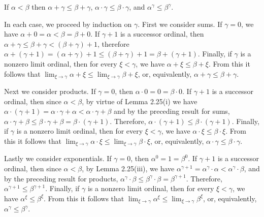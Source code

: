  If $\alpha < \beta$ then $\alpha + \gamma \leq \beta + \gamma$, 
$\alpha \cdot \gamma \leq \beta \cdot \gamma$, and 
$\alpha^{\gamma} \leq \beta^{\gamma}$.
\begin{solution}
In each case, we proceed by induction on $\gamma$. First we consider sums. If 
$\gamma = 0$, we have $\alpha + 0 = \alpha < \beta = \beta + 0$. If 
$\gamma + 1$ is a successor ordinal, then 
$\alpha + \gamma \leq \beta + \gamma < \left( \beta + \gamma \right) + 1$, 
therefore $\alpha + \left( \gamma + 1 \right) = \left( \alpha + \gamma \right)
+ 1 \leq \left( \beta + \gamma \right) + 1 = \beta + \left( \gamma + 1
\right)$. Finally, if $\gamma$ is a nonzero limit ordinal, then for every 
$\xi < \gamma$, we have $\alpha + \xi \leq \beta + \xi$. From this it follows 
that $\lim_{\xi \rightarrow \gamma} \alpha + \xi \leq \lim_{\xi \rightarrow 
\gamma} \beta + \xi$, or, equivalently, $\alpha + \gamma \leq \beta + \gamma$.

Next we consider products. If $\gamma = 0$, then 
$\alpha \cdot 0 = 0 = \beta \cdot 0$. If $\gamma + 1$ is a successor ordinal, 
then since $\alpha < \beta$, by virtue of Lemma 2.25(i) we have 
$\alpha \cdot \left( \gamma + 1 \right) = \alpha \cdot \gamma + \alpha < \alpha
\cdot \gamma + \beta$ and by the preceding result for sums, 
$\alpha \cdot \gamma + \beta \leq \beta \cdot \gamma + \beta = \beta \cdot 
\left( \gamma + 1 \right)$. Therefore, 
$\alpha \cdot \left( \gamma + 1 \right) \leq \beta \cdot \left( \gamma + 1 
\right)$. Finally, if $\gamma$ is a nonzero limit ordinal, then for every 
$\xi < \gamma$, we have $\alpha \cdot \xi \leq \beta \cdot \xi$. From this it 
follows that 
$\lim_{\xi \rightarrow \gamma} \alpha \cdot \xi \leq \lim_{\xi \rightarrow 
\gamma} \beta \cdot \xi$, or, equivalently, 
$\alpha \cdot \gamma \leq \beta \cdot \gamma$.

Lastly we consider exponentials. If $\gamma = 0$, then 
$\alpha^0 = 1 = \beta^0$. If $\gamma + 1$ is a successor ordinal, then since 
$\alpha < \beta$, by Lemma 2.25(iii), we have 
$\alpha^{\gamma + 1} = \alpha^{\gamma} \cdot \alpha < \alpha^{\gamma} \cdot 
\beta$, and by the preceding result for products, 
$\alpha^{\gamma} \cdot \beta \leq \beta^{\gamma} \cdot \beta = \beta^{\gamma + 
1}$. Therefore, $\alpha^{\gamma + 1} \leq \beta^{\gamma + 1}$. Finally, if 
$\gamma$ is a nonzero limit ordinal, then for every $\xi < \gamma$, we have 
$\alpha^{\xi} \leq \beta^{\xi}$. From this it follows that 
$\lim_{\xi \rightarrow \gamma} \alpha^{\xi} \leq \lim_{\xi \rightarrow \gamma} 
\beta^{\xi}$, or, equivalently, $\alpha^{\gamma} \leq \beta^{\gamma}$.
\end{solution}